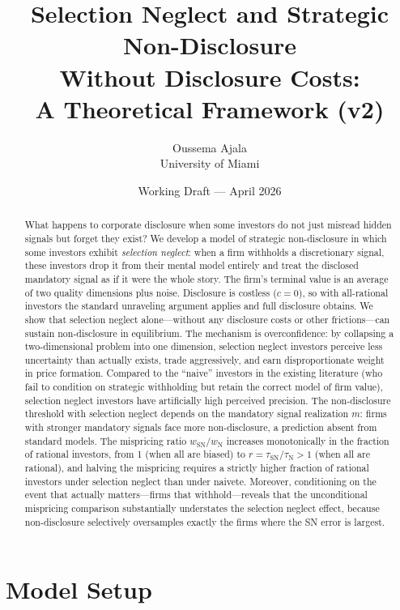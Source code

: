 \documentclass[12pt]{article}
\title{Selection Neglect and Strategic Non-Disclosure \\ Without Disclosure Costs: \\[6pt] \large A Theoretical Framework (v2)}
\author{Oussema Ajala \\ University of Miami}
\date{Working Draft --- April 2026}
\theoremstyle{plain}
\theoremstyle{definition}
\newcommand{\SN}{\mathrm{SN}}
\newcommand{\N}{\mathrm{N}}
\begin{document}
\maketitle

\begin{abstract}
\noindent What happens to corporate disclosure when some investors do not just misread hidden signals but forget they exist? We develop a model of strategic non-disclosure in which some investors exhibit \emph{selection neglect}: when a firm withholds a discretionary signal, these investors drop it from their mental model entirely and treat the disclosed mandatory signal as if it were the whole story. The firm's terminal value is an average of two quality dimensions plus noise. Disclosure is costless ($c = 0$), so with all-rational investors the standard unraveling argument applies and full disclosure obtains. We show that selection neglect alone---without any disclosure costs or other frictions---can sustain non-disclosure in equilibrium. The mechanism is overconfidence: by collapsing a two-dimensional problem into one dimension, selection neglect investors perceive less uncertainty than actually exists, trade aggressively, and earn disproportionate weight in price formation. Compared to the ``naive'' investors in the existing literature (who fail to condition on strategic withholding but retain the correct model of firm value), selection neglect investors have artificially high perceived precision. The non-disclosure threshold with selection neglect depends on the mandatory signal realization $m$: firms with stronger mandatory signals face more non-disclosure, a prediction absent from standard models. The mispricing ratio $w_\SN/w_\N$ increases monotonically in the fraction of rational investors, from 1 (when all are biased) to $r = \tau_\SN/\tau_\N > 1$ (when all are rational), and halving the mispricing requires a strictly higher fraction of rational investors under selection neglect than under naivete. Moreover, conditioning on the event that actually matters---firms that withhold---reveals that the unconditional mispricing comparison substantially understates the selection neglect effect, because non-disclosure selectively oversamples exactly the firms where the SN error is largest.
\end{abstract}

\tableofcontents
\newpage

\section{Model Setup}
\label{sec:setup}
\end{document}
